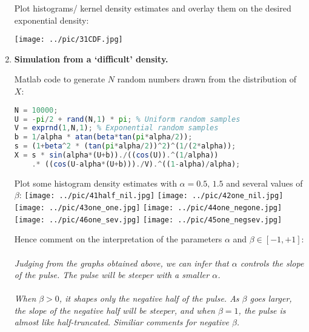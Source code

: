 \documentclass[12pt]{article}
\begin{document}
\begin{enumerate}
\vspace{2cm}



Plot histograms/ kernel density estimates and overlay them on the desired exponential density:

\texttt{[image: ../pic/31CDF.jpg]}

\vspace{3in}

\item {\bf Simulation from a `difficult'  density.}

Matlab code to generate $N$ random numbers drawn from the distribution of $X$:
\\
{\em
\begin{lstlisting}[language=Octave]
N = 10000;
U = -pi/2 + rand(N,1) * pi; % Uniform random samples
V = exprnd(1,N,1); % Exponential random samples
b = 1/alpha * atan(beta*tan(pi*alpha/2));
s = (1+beta^2 * (tan(pi*alpha/2))^2)^(1/(2*alpha));
X = s * sin(alpha*(U+b))./((cos(U)).^(1/alpha))
    .* ((cos(U-alpha*(U+b)))./V).^((1-alpha)/alpha);
\end{lstlisting}
}
\vspace{0.5cm}

Plot some histogram density estimates with $\alpha=0.5,\,1.5$ and several values of $\beta$:
\texttt{[image: ../pic/41half\_nil.jpg]}
\texttt{[image: ../pic/42one\_nil.jpg]}
\\
\texttt{[image: ../pic/43one\_one.jpg]}
\texttt{[image: ../pic/44one\_negone.jpg]}
\\
\texttt{[image: ../pic/46one\_sev.jpg]}
\texttt{[image: ../pic/45one\_negsev.jpg]}

\vspace{3in}

Hence comment on the interpretation of the parameters $\alpha$ and $\beta\in[-1,+1]$:
\\\\
{\em
Judging from the graphs obtained above, we can infer that \begin{math}\alpha\end{math} controls the slope of the pulse. The pulse will be steeper with a smaller \begin{math}\alpha\end{math}.\\\\
When \begin{math}\beta > 0\end{math}, it shapes only the negative half of the pulse. As \begin{math}\beta\end{math} goes larger, the slope of the negative half will be steeper, and when \begin{math}\beta = 1\end{math}, the pulse is almost like half-truncated. Similiar comments for negative \begin{math}\beta\end{math}.  
}

\end{enumerate}
\end{document}
